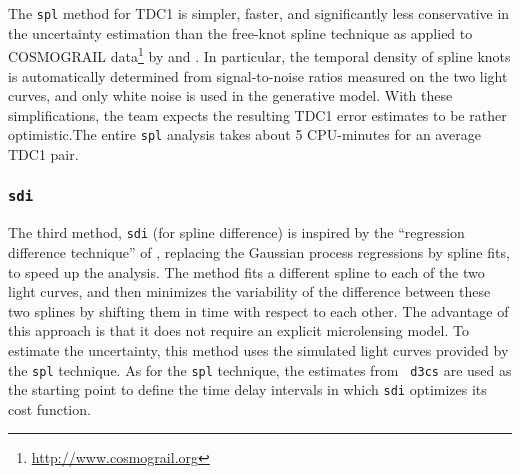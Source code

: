 \documentclass[traditabstract]{aa}
\begin{document}
The {\tt spl} method for TDC1 is simpler, faster, and significantly
less conservative in the uncertainty estimation than the free-knot
spline technique as applied to COSMOGRAIL
data\footnote{\url{http://www.cosmograil.org}} by \citet{Tewes:2013iz}
and \citet{RathnaKumar:2013eu}. In particular, the temporal density of spline
knots is automatically determined from signal-to-noise ratios measured on
the two light curves, and only white noise is used in the generative model.
With these simplifications, the team expects the resulting TDC1 error estimates to be rather optimistic.The entire {\tt spl} analysis takes about 5
CPU-minutes for an average TDC1 pair.

\subsubsection{{\tt sdi}}

The third method, {\tt sdi} (for spline difference) is inspired by the
``regression difference technique'' of \citet{pycs}, replacing the
Gaussian process regressions by spline fits, to speed up the
analysis. The method fits a different spline to each of the two light
curves, and then minimizes the variability of the difference between
these two splines by shifting them in time with respect to each other.
The advantage of this approach is that it does not require an
explicit microlensing model. To estimate the uncertainty, this method
uses the simulated light curves provided by the {\tt spl}
technique. As for the {\tt spl} technique, the estimates from {\tt
d3cs} are used as the starting point to define the time delay
intervals in which {\tt sdi} optimizes its cost function. 
\end{document}
